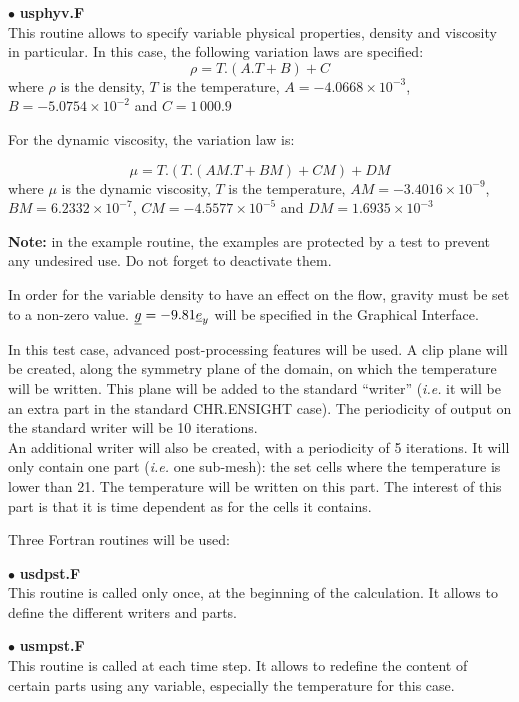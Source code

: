 	
$\bullet$ {\bfseries usphyv.F}\\
This routine allows to specify variable physical properties, density and
viscosity in particular. In this case, the following variation laws are specified:
\begin{equation}
\rho = T.(A.T + B) + C
\end{equation}
where $\rho$ is the density, $T$ is the temperature, $A = -4.0668\times10^{-3}$,
$B =-5.0754\times 10^{-2}$ and $C = 1\,000.9$ 


For the dynamic viscosity, the variation law is: 

\begin{equation}
\mu = T.(T.(AM.T + BM) + CM) + DM
\end{equation}
where $\mu$ is the dynamic viscosity, $T$ is the temperature,
$AM=-3.4016\times 10^{-9}$, $BM = 6.2332\times 10^{-7}$,
$CM = -4.5577\times 10^{-5}$ and $DM = 1.6935\times 10^{-3}$


\textbf{Note:} in the example routine, the examples are protected by a test to prevent any
undesired use. Do not forget to deactivate them.

In order for the variable density to have an effect on the flow, gravity must be
set to a non-zero value. $\underline{g} = -9.81 \underline{e}_y$ will be specified in the
Graphical Interface.	


In this test case, advanced post-processing features will be used. A clip
plane will be created, along the symmetry plane of the domain, on which the
temperature will be written. This plane will be added to the standard
``writer'' ({\em i.e.} it will be an extra part in the standard CHR.ENSIGHT
case). The periodicity of output on the standard writer will be 10 iterations.\\
An additional writer will also be created, with a periodicity of 5
iterations. It will only contain one part ({\em i.e.} one sub-mesh): the set
cells where the temperature is lower than 21\degresC. The temperature will be
written on this part. The interest of this part is that it is time dependent
as for the cells it contains.

Three Fortran routines will be used:
 
$\bullet$ {\bfseries usdpst.F}\\
This routine is called only once, at the beginning of the calculation. It allows
to define the different writers and parts.

$\bullet$ {\bfseries usmpst.F}\\
This routine is called at each time step. It allows to redefine the content of
certain parts using any variable, especially the temperature for this case.

